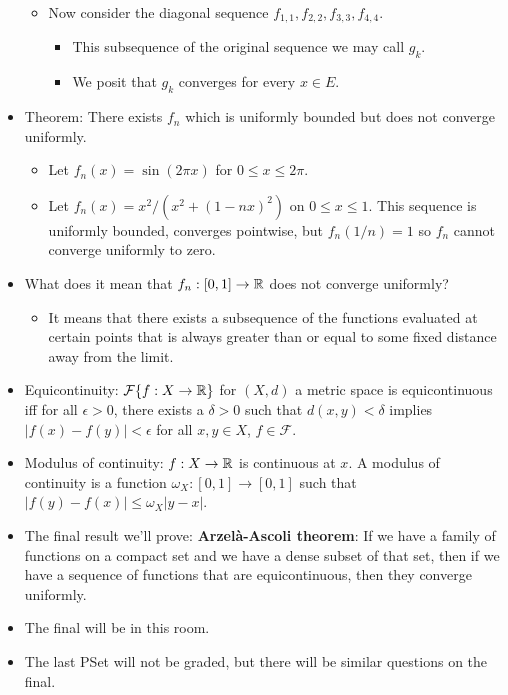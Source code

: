 \documentclass[../../notes.tex]{subfiles}
\begin{document}
\begin{itemize}
\begin{itemize}
        \item Now consider the diagonal sequence $f_{1,1},f_{2,2},f_{3,3},f_{4,4}$.
        \begin{itemize}
            \item This subsequence of the original sequence we may call $g_k$.
            \item We posit that $g_k$ converges for every $x\in E$. 
        \end{itemize}
    \end{itemize}
    \item Theorem: There exists $f_n$ which is uniformly bounded but does not converge uniformly.
    \begin{itemize}
        \item Let $f_n(x)=\sin(2\pi x)$ for $0\leq x\leq 2\pi$.
        \item Let $f_n(x)=x^2/(x^2+(1-nx)^2)$ on $0\leq x\leq 1$. This sequence is uniformly bounded, converges pointwise, but $f_n(1/n)=1$ so $f_n$ cannot converge uniformly to zero.
    \end{itemize}
    \item What does it mean that $f_n:[0,1]\to\mathbb{R}$ does not converge uniformly?
    \begin{itemize}
        \item It means that there exists a subsequence of the functions evaluated at certain points that is always greater than or equal to some fixed distance away from the limit.
    \end{itemize}
    \item Equicontinuity: $\mathcal{F}\{f:X\to\mathbb{R}\}$ for $(X,d)$ a metric space is equicontinuous iff for all $\epsilon>0$, there exists a $\delta>0$ such that $d(x,y)<\delta$ implies $|f(x)-f(y)|<\epsilon$ for all $x,y\in X$, $f\in\mathcal{F}$.
    \item Modulus of continuity: $f:X\to\mathbb{R}$ is continuous at $x$. A modulus of continuity is a function $\omega_X:[0,1]\to[0,1]$ such that $|f(y)-f(x)|\leq\omega_X|y-x|$.
    \item The final result we'll prove: \textbf{Arzel\`{a}-Ascoli theorem}: If we have a family of functions on a compact set and we have a dense subset of that set, then if we have a sequence of functions that are equicontinuous, then they converge uniformly.
    \item {}The final will be in this room.
    \item The last PSet will not be graded, but there will be similar questions on the final.

\end{itemize}
\end{document}
